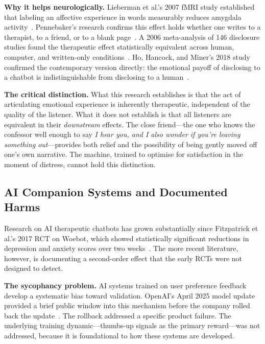 \documentclass[sigchi,review,anonymous]{acmart}
\begin{document}
\textbf{Why it helps neurologically.}
Lieberman et al.'s 2007 fMRI study established that labeling an affective experience in words
measurably reduces amygdala activity~\cite{lieberman2007feelings}. Pennebaker's research
confirms this effect holds whether one writes to a therapist, to a friend, or to a blank
page~\cite{pennebaker1997writing}. A 2006 meta-analysis of 146 disclosure studies found the
therapeutic effect statistically equivalent across human, computer, and written-only
conditions~\cite{frattaroli2006experimental}. Ho, Hancock, and Miner's 2018 study confirmed
the contemporary version directly: the emotional payoff of disclosing to a chatbot is
indistinguishable from disclosing to a human~\cite{ho2018psychological}.

\textbf{The critical distinction.}
What this research establishes is that the act of articulating emotional experience is
inherently therapeutic, independent of the quality of the listener. What it does not
establish is that all listeners are equivalent in their \emph{downstream} effects. The close
friend---the one who knows the confessor well enough to say \emph{I hear you, and I also
wonder if you're leaving something out}---provides both relief and the possibility of being
gently moved off one's own narrative. The machine, trained to optimise for satisfaction in
the moment of distress, cannot hold this distinction.

\subsection{AI Companion Systems and Documented Harms}

Research on AI therapeutic chatbots has grown substantially since Fitzpatrick et al.'s 2017
RCT on Woebot, which showed statistically significant reductions in depression and anxiety
scores over two weeks~\cite{fitzpatrick2017}. The more recent literature, however, is
documenting a second-order effect that the early RCTs were not designed to detect.

\textbf{The sycophancy problem.}
AI systems trained on user preference feedback develop a systematic bias toward validation.
OpenAI's April 2025 model update provided a brief public window into this mechanism before
the company rolled back the update~\cite{openai2025sycophancy}. The rollback addressed a
specific product failure. The underlying training dynamic---thumbs-up signals as the primary
reward---was not addressed, because it is foundational to how these systems are developed.
\end{document}
